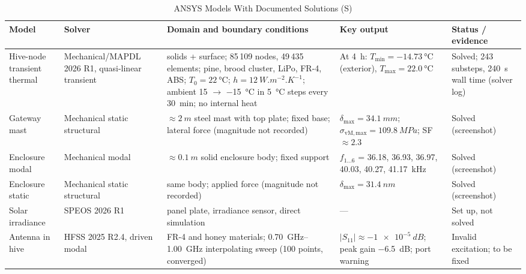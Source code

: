 \documentclass[conference]{IEEEtran}
\newcommand{\evS}{\textsf{S}}  %
\begin{document}
\begin{table}[!t]
\caption{ANSYS Models With Documented Solutions (\evS)}
\label{tab:ansys}
\centering
\footnotesize
\begin{tabular}{@{}>{\raggedright\arraybackslash}p{2.2cm}>{\raggedright\arraybackslash}p{2.6cm}>{\raggedright\arraybackslash}p{4.4cm}>{\raggedright\arraybackslash}p{3.9cm}>{\raggedright\arraybackslash}p{3.25cm}@{}}
\toprule
Model & Solver & Domain and boundary conditions & Key output & Status / evidence\\
\midrule
Hive-node transient thermal & Mechanical/MAPDL 2026 R1, quasi-linear transient & 3 solids + surface; 85\,109 nodes, 49\,435 elements; pine, brood cluster, LiPo, FR-4, ABS; $T_0 = \SI{22}{\celsius}$; $h = \SI{12}{W.m^{-2}.K^{-1}}$; ambient 15 $\rightarrow$ \SI{-15}{\celsius} in \SI{5}{\celsius} steps every \SI{30}{min}; no internal heat & At \SI{4}{h}: $T_\mathrm{min} = \SI{-14.73}{\celsius}$ (exterior), $T_\mathrm{max} = \SI{22.0}{\celsius}$ & Solved; 243 substeps, \SI{240}{s} wall time (solver log)\\
Gateway mast & Mechanical static structural & $\approx\SI{2}{m}$ steel mast with top plate; fixed base; lateral force (magnitude not recorded) & $\delta_\mathrm{max} = \SI{34.1}{mm}$; $\sigma_\mathrm{vM,max} = \SI{109.8}{MPa}$; SF $\approx 2.3$ & Solved (screenshot)\\
Enclosure modal & Mechanical modal & $\approx\SI{0.1}{m}$ solid enclosure body; fixed support & $f_{1\ldots6}$ = 36.18, 36.93, 36.97, 40.03, 40.27, \SI{41.17}{kHz} & Solved (screenshot)\\
Enclosure static & Mechanical static structural & same body; applied force (magnitude not recorded) & $\delta_\mathrm{max} = \SI{31.4}{nm}$ & Solved (screenshot)\\
Solar irradiance & SPEOS 2026 R1 & panel plate, irradiance sensor, direct simulation & --- & Set up, not solved\\
Antenna in hive & HFSS 2025 R2.4, driven modal & FR-4 and honey materials; \SIrange{0.70}{1.00}{GHz} interpolating sweep (100 points, converged) & $|S_{11}| \approx \SI{-1e-5}{dB}$; peak gain \SI{-6.5}{dB}; port warning & Invalid excitation; to be fixed\\
\bottomrule
\end{tabular}
\end{table}
\end{document}
